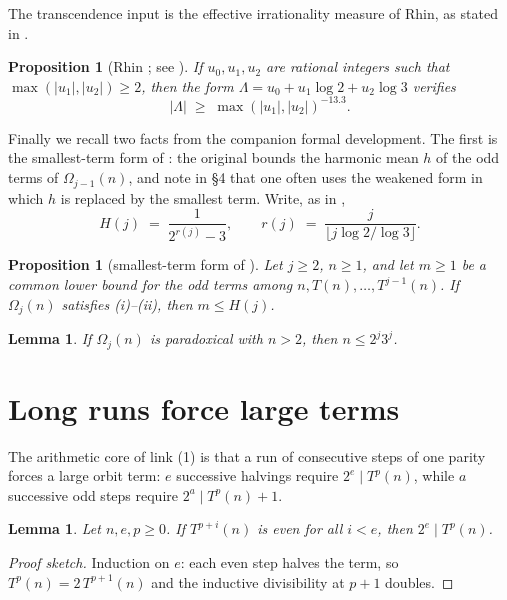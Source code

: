 \documentclass[11pt]{amsart}
\theoremstyle{plain}
\newtheorem{proposition}[theorem]{Proposition}
\newtheorem{lemma}[theorem]{Lemma}
\theoremstyle{definition}
\theoremstyle{remark}
\begin{document}
The transcendence input is the effective irrationality measure of Rhin, as
stated in \cite[Prop.~6.3]{Roz25}.

\begin{proposition}[Rhin \cite{Rhi87}; see {\cite[Prop.~6.3]{Roz25}}]\label{prop:rhin}
If $u_0,u_1,u_2$ are rational integers such that
$\max(|u_1|,|u_2|)\ge 2$, then the form
$\Lambda=u_0+u_1\log 2+u_2\log 3$ verifies
\[
|\Lambda| \;\ge\; \max(|u_1|,|u_2|)^{-13.3}.
\]
\end{proposition}

Finally we recall two facts from the companion formal development.  The
first is the smallest-term form of \cite[Cor.~4.4]{Roz25}: the original
bounds the harmonic mean $h$ of the odd terms of $\Omega_{j-1}(n)$, and
\cite{Roz25} note in \S4 that one often uses the weakened form in which $h$
is replaced by the smallest term.  Write, as in \cite[eq.~(12)]{Roz25},
\[
H(j) \;=\; \frac{1}{2^{r(j)}-3},
\qquad
r(j) \;=\; \frac{j}{\bigl\lfloor j\log 2/\log 3\bigr\rfloor}.
\]

\begin{proposition}[smallest-term form of {\cite[Cor.~4.4]{Roz25}}]\label{prop:cor44}
Let $j\ge 2$, $n\ge 1$, and let $m\ge 1$ be a common lower bound for the odd
terms among $n,T(n),\dots,T^{j-1}(n)$.  If $\Omega_j(n)$ satisfies
(i)--(ii), then $m\le H(j)$.
\end{proposition}

\begin{lemma}\label{lem:startle}
If $\Omega_j(n)$ is paradoxical with $n>2$, then $n\le 2^{j}3^{j}$.
\end{lemma}

\section{Long runs force large terms}\label{sec:runs}

The arithmetic core of link (1) is that a run of consecutive steps of one
parity forces a large orbit term: $e$ successive halvings require
$2^{e}\mid T^{p}(n)$, while $a$ successive odd steps require
$2^{a}\mid T^{p}(n)+1$.

\begin{lemma}\label{lem:evenrun}
Let $n,e,p\ge 0$.  If $T^{p+i}(n)$ is even for all $i<e$, then
$2^{e}\mid T^{p}(n)$.
\end{lemma}

\begin{proof}[Proof sketch]
Induction on $e$: each even step halves the term, so $T^{p}(n)=2\,T^{p+1}(n)$
and the inductive divisibility at $p+1$ doubles.
\end{proof}
\end{document}
